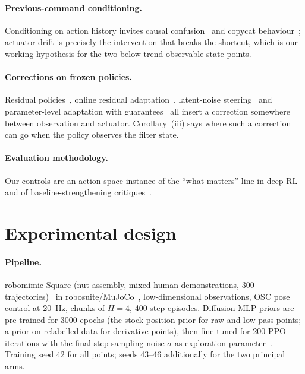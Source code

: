 \documentclass{article}
\begin{document}
\paragraph{Previous-command conditioning.} Conditioning on action history invites causal confusion~\citep{dehaan2019causalconfusion} and copycat behaviour~\citep{wen2020copycat}; actuator drift is precisely the intervention that breaks the shortcut, which is our working hypothesis for the two below-trend observable-state points.

\paragraph{Corrections on frozen policies.} Residual policies~\citep{silver2018residual,johannink2019residual}, online residual adaptation~\citep{muttaqien2026orpaonlineresidualpolicy}, latent-noise steering~\citep{wagenmaker2025steeringdiffusionpolicylatent} and parameter-level adaptation with guarantees~\citep{oconnell2024neuralflyenablesrapidlearning,kumar2021rmarapidmotoradaptation} all insert a correction somewhere between observation and actuator. Corollary~(iii) says where such a correction can go when the policy observes the filter state.

\paragraph{Evaluation methodology.} Our controls are an action-space instance of the ``what matters'' line in deep RL~\citep{henderson2018deeprlmatters,engstrom2020implementationmatters,andrychowicz2021whatmatters,agarwal2021precipice} and of baseline-strengthening critiques~\citep{press2024rdumbsimpleapproachquestions,dauner2023partingmisconceptionslearningbasedvehicle}.

\section{Experimental design}
\label{sec:design}

\paragraph{Pipeline.} robomimic Square (nut assembly, mixed-human demonstrations, 300 trajectories)~\citep{mandlekar2021robomimic} in robosuite/MuJoCo~\citep{zhu2020robosuite}, low-dimensional observations, OSC pose control at \SI{20}{Hz}, chunks of $H=4$, 400-step episodes. Diffusion MLP priors are pre-trained for 3000 epochs (the stock position prior for raw and low-pass points; a prior on relabelled data for derivative points), then fine-tuned for 200 PPO iterations with the final-step sampling noise $\sigma$ as exploration parameter~\citep{ren2024diffusionpolicypolicyoptimization}. Training seed 42 for all points; seeds 43--46 additionally for the two principal arms.
\end{document}

